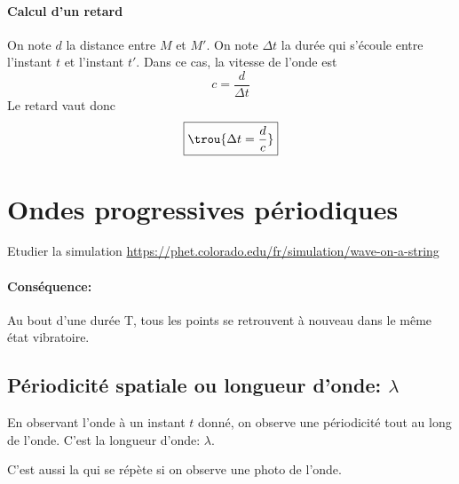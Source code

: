 
\paragraph*{Calcul d'un retard}

On note $d$ la distance entre $M$ et $M'$. On note $\Delta t$ la durée qui s'écoule entre l'instant $t$ et l'instant $t'$. Dans ce cas, la vitesse de l'onde est $$c=\frac{d}{\Delta t}$$ Le retard vaut donc $$\boxed{\trou{\Delta t = \frac{d}{c}}}$$



\section{Ondes progressives périodiques}

Etudier la simulation \url{https://phet.colorado.edu/fr/simulation/wave-on-a-string}
 

 
\paragraph*{Conséquence:}Au bout d'une durée T, tous les points se retrouvent à nouveau dans le même état vibratoire.\\

\subsection{Périodicité spatiale ou longueur d'onde: $\lambda$}
En observant l'onde à un instant $t$ donné, on observe une périodicité tout au long de l'onde. C'est la longueur d'onde: $\lambda$. 


 C'est aussi la  qui se répète si on observe une photo de l'onde.

